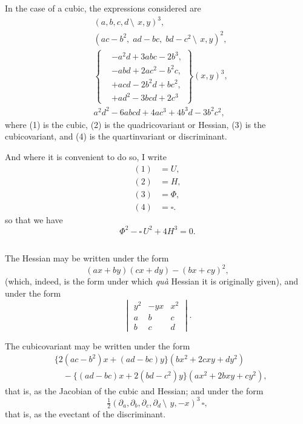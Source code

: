 \documentclass[12pt,a4paper]{article}
\begin{document}
In the case of a cubic, the expressions considered are
\begin{align}
&(a, b, c, d\,\setminus\!\!\:\, x, y)^3, \tag{1}\\
&(ac - b^2,\; ad - bc,\; bd - c^2\,\setminus\!\!\:\, x, y)^2, \tag{2}\\
&\left\{\begin{aligned}
&-a^2d + 3abc - 2b^3,\\
&-abd + 2ac^2 - b^2c,\\
&+acd - 2b^2d + bc^2,\\
&+ad^2 - 3bcd + 2c^3
\end{aligned}\right\}(x, y)^3, \tag{3}\\
&a^2d^2 - 6abcd + 4ac^3 + 4b^3d - 3b^2c^2, \tag{4}
\end{align}
where (1) is the cubic, (2) is the quadricovariant or Hessian, (3) is the cubicovariant, and (4) is the quartinvariant or discriminant.

And where it is convenient to do so, I write
\begin{align*}
(1) &= U,\\
(2) &= H,\\
(3) &= \Phi,\\
(4) &= \square.
\end{align*}
so that we have
\[
\Phi^2 - \square\,U^2 + 4H^3 = 0.
\]

\subsection{}

The Hessian may be written under the form
\[
(ax + by)(cx + dy) - (bx + cy)^2,
\]
(which, indeed, is the form under which \textit{qu\`a} Hessian it is originally given), and under the form
\[
\begin{vmatrix}
y^2 & -yx & x^2 \\
a & b & c \\
b & c & d
\end{vmatrix}.
\]

The cubicovariant may be written under the form
\begin{align*}
&\{2(ac - b^2)x + (ad - bc)y\}(bx^2 + 2cxy + dy^2)\\
&\quad - \{(ad - bc)x + 2(bd - c^2)y\}(ax^2 + 2bxy + cy^2),
\end{align*}
that is, as the Jacobian of the cubic and Hessian; and under the form
\[
\tfrac{1}{2}(\partial_a, \partial_b, \partial_c, \partial_d\,\setminus\!\!\:\, y, -x)^3\,\square,
\]
that is, as the evectant of the discriminant.
\end{document}
